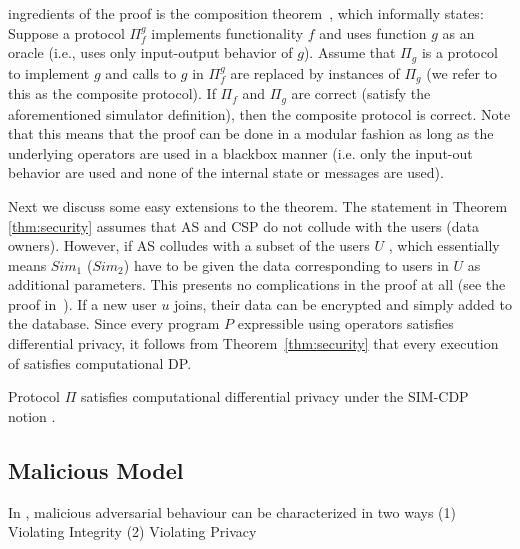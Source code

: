 ingredients of the proof is the composition theorem~\cite[Section
  7.3.1]{Oded}, which informally states: Suppose a protocol $\Pi_f^g$
implements functionality $f$ and uses function $g$ as an oracle (i.e.,
uses only input-output behavior of $g$).  Assume that $\Pi_g$ is a
protocol to implement $g$ and calls to $g$ in $\Pi_f^g$ are replaced
by instances of $\Pi_g$ (we refer to this as the composite
protocol). If $\Pi_f$ and $\Pi_g$ are correct (satisfy the aforementioned simulator
definition), then the composite protocol is
correct. Note that this means that the proof can be done in a modular
fashion as long as the underlying operators are
used in a blackbox manner (i.e. only the input-out behavior are used
and none of the internal state or messages are used).

Next we discuss some easy extensions to the theorem.  The statement in Theorem \ref{thm:security} assumes that \textsf{AS} and \textsf{CSP} do
not collude with the users (data owners). However, if \textsf{AS}
colludes with a subset of the users $U$ , which essentially means $Sim_1$
($Sim_2$) have to be given the data corresponding to users in $U$ as
additional parameters. This presents no complications in the proof at
all (see the proof in~\cite{LReg}). If a new user $u$ joins, their
data can be encrypted and simply added to the database. %
Since every program $P$
expressible using \system operators satisfies differential privacy,
it follows from Theorem~\ref{thm:security} that every execution of
\system satisfies computational DP.
 \noindent
\begin{corollary} 
	Protocol $\Pi$ satisfies computational differential privacy under the \textsf{SIM-CDP} notion \cite{CDP}.
\end{corollary}

\subsection{Malicious Model}
In \system, malicious adversarial behaviour can be characterized in two ways (1) Violating Integrity  (2) Violating Privacy 

